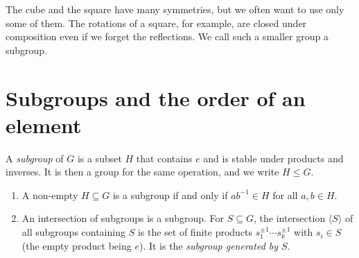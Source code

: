 The cube and the square have many symmetries, but we often want to use only some of them. The rotations of a square, for example, are closed under composition even if we forget the reflections. We call such a smaller group a subgroup.

\section{Subgroups and the order of an element}

\begin{definition}
A \emph{subgroup} of $G$ is a subset $H$ that contains $e$ and is stable under products and inverses. It is then a group for the same operation, and we write $H\le G$.
\end{definition}

\begin{proposition}\label{prop:subgroup}
\begin{enumerate}[label=(\alph*)]
\item A non-empty $H\subseteq G$ is a subgroup if and only if $ab^{-1}\in H$ for all $a,b\in H$.
\item An intersection of subgroups is a subgroup. For $S\subseteq G$, the intersection $\langle S\rangle$ of all subgroups containing $S$ is the set of finite products $s_1^{\pm1}\cdots s_k^{\pm1}$ with $s_i\in S$ (the empty product being $e$). It is the \emph{subgroup generated by $S$}.
\end{enumerate}
\end{proposition}
